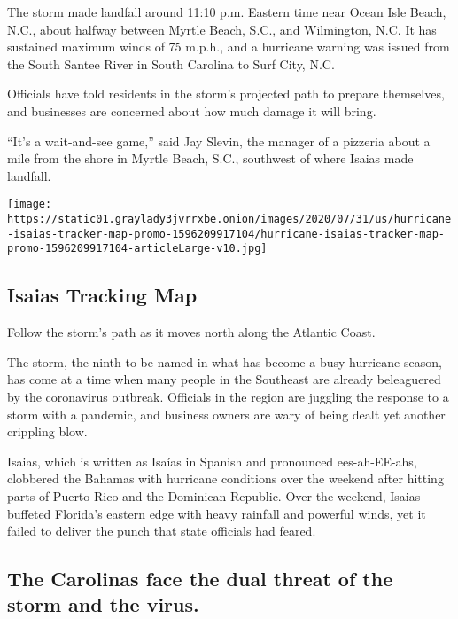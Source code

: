 The storm made landfall around 11:10 p.m. Eastern time near Ocean Isle
Beach, N.C., about halfway between Myrtle Beach, S.C., and Wilmington,
N.C. It has sustained maximum winds of 75 m.p.h., and a hurricane
warning was issued from the South Santee River in South Carolina to Surf
City, N.C.

Officials have told residents in the storm's projected path to prepare
themselves, and businesses are concerned about how much damage it will
bring.

``It's a wait-and-see game,'' said Jay Slevin, the manager of a pizzeria
about a mile from the shore in Myrtle Beach, S.C., southwest of where
Isaias made landfall.

\href{https://www.nytimes3xbfgragh.onion/interactive/2020/07/31/us/hurricane-isaias-tracker-map.html}{}

\texttt{[image: https://static01.graylady3jvrrxbe.onion/images/2020/07/31/us/hurricane-isaias-tracker-map-promo-1596209917104/hurricane-isaias-tracker-map-promo-1596209917104-articleLarge-v10.jpg]}

\hypertarget{isaias-tracking-map}{%
\subsection{Isaias Tracking Map}\label{isaias-tracking-map}}

Follow the storm's path as it moves north along the Atlantic Coast.

The storm, the ninth to be named in what has become a busy hurricane
season, has come at a time when many people in the Southeast are already
beleaguered by the coronavirus outbreak. Officials in the region are
juggling the response to a storm with a pandemic, and business owners
are wary of being dealt yet another crippling blow.

Isaias, which is written as Isaías in Spanish and pronounced
ees-ah-EE-ahs, clobbered the Bahamas with hurricane conditions over the
weekend after hitting parts of Puerto Rico and the Dominican Republic.
Over the weekend, Isaias buffeted Florida's eastern edge with heavy
rainfall and powerful winds, yet it failed to deliver the punch that
state officials had feared.

\hypertarget{the-carolinas-face-the-dual-threat-of-the-storm-and-the-virus}{%
\subsection{The Carolinas face the dual threat of the storm and the
virus.}\label{the-carolinas-face-the-dual-threat-of-the-storm-and-the-virus}}

